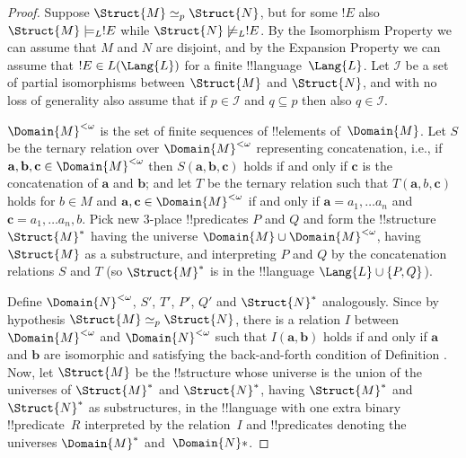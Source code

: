 \documentclass[../../include/open-logic-section]{subfiles}
\begin{document}
\begin{proof}
  Suppose $\Struct{M} \simeq_p \Struct{N}$, but for some $!E$ also
  $\Struct{M} \models_L !E$ while $\Struct{N} \not\models_L !E$. By
  the Isomorphism Property we can assume that $M$ and $N$ are
  disjoint, and by the Expansion Property we can assume that
  $!E \in L(\Lang{L})$ for a finite !!{language}~$\Lang{L}$. Let
  $\mathcal{I}$ be a set of partial isomorphisms between $\Struct{M}$
  and $\Struct{N}$, and with no loss of generality also assume
  that if $p \in \mathcal{I}$ and $q \subseteq p$ then also
  $q \in \mathcal{I}$.

$\Domain{M}^{<\omega}$ is the set of finite sequences of !!{element}s
of~$\Domain{M}$. Let $S$ be the ternary relation over $\Domain{M}^{<\omega}$
representing concatenation, i.e., if $\mathbf{a}, \mathbf{b},
\mathbf{c} \in \Domain{M}^{<\omega}$ then $S(\mathbf{a}, \mathbf{b},
\mathbf{c})$ holds if and only if $\mathbf{c}$ is the concatenation of
$\mathbf{a}$ and $\mathbf{b}$; and let $T$ be the ternary relation
such that $T(\mathbf{a}, b, \mathbf{c})$ holds for $b \in M$ and
$\mathbf{a}, \mathbf{c} \in \Domain{M}^{<\omega}$ if and only if $\mathbf{a} =
a_1, \dots a_n$ and $\mathbf{c} = a_1, \dots a_n, b$.  Pick new
3-place !!{predicate}s $P$ and $Q$ and form the !!{structure}
$\Struct{M}^*$ having the universe $\Domain{M} \cup \Domain{M}^{<\omega}$, having
$\Struct{M}$ as a substructure, and interpreting $P$ and $Q$ by the
concatenation relations $S$ and $T$ (so $\Struct{M}^*$ is in the
!!{language} $\Lang{L} \cup \{ P, Q\}$).

Define $\Domain{N}^{<\omega}$, $S'$, $T'$, $P'$, $Q'$ and
$\Struct{N}^*$ analogously. Since by hypothesis $\Struct{M} \simeq_p
\Struct{N}$, there is a relation $I$ between $\Domain{M}^{<\omega}$
and $\Domain{N}^{<\omega}$ such that $I(\mathbf{a}, \mathbf{b})$
holds if and only if $\mathbf{a}$ and $\mathbf{b}$ are isomorphic and
satisfying the back-and-forth condition of Definition
.  Now, let $\Struct{M}$ be the
!!{structure} whose universe is the union of the universes of
$\Struct{M}^*$ and $\Struct{N}^*$, having $\Struct{M}^*$ and
$\Struct{N}^*$ as substructures, in the !!{language} with one extra
binary !!{predicate}~$R$ interpreted by the relation~$I$ and
!!{predicate}s denoting the universes $\Domain{M}^*$
and~$\Domain{N}*$.


\end{proof}
\end{document}
